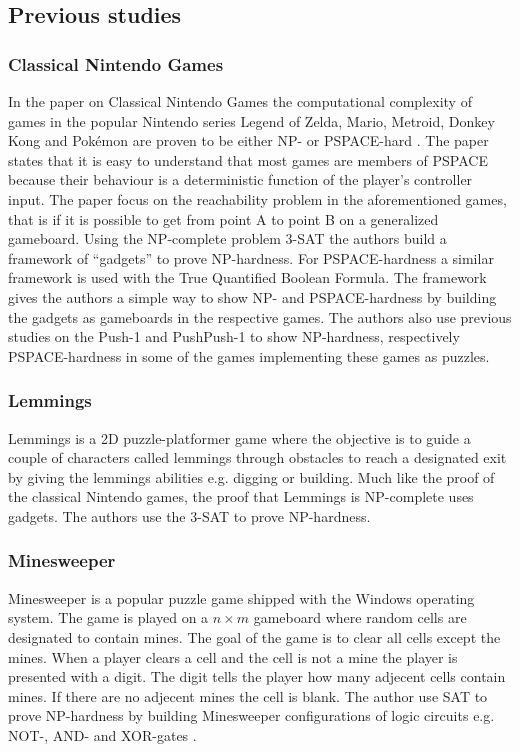 \subsection{Previous studies}
\subsubsection{Classical Nintendo Games}

In the paper on Classical Nintendo Games the computational complexity of games in the popular Nintendo series Legend of Zelda, Mario, Metroid, Donkey Kong and Pokémon are proven to be either NP- or PSPACE-hard \cite{classic}. The paper states that it is easy to understand that most games are members of PSPACE because their behaviour is a deterministic function of the player's controller input. The paper focus on the reachability problem in the aforementioned games, that is if it is possible to get from point A to point B on a generalized gameboard. Using the NP-complete problem 3-SAT the authors build a framework of ``gadgets'' to prove NP-hardness. For PSPACE-hardness a similar framework is used with the True Quantified Boolean Formula. The framework gives the authors a simple way to show NP- and PSPACE-hardness by building the gadgets as gameboards in the respective games. The authors also use previous studies on the Push-1 \cite{push1} and PushPush-1 \cite{pushpushk} to show NP-hardness, respectively PSPACE-hardness in some of the games implementing these games as puzzles. 

\subsubsection{Lemmings}

Lemmings is a 2D puzzle-platformer game where the objective is to guide a couple of characters called lemmings through obstacles to reach a designated exit by giving the lemmings abilities e.g. digging or building. Much like the proof of the classical Nintendo games, the proof that Lemmings is NP-complete uses gadgets. The authors use the 3-SAT to prove NP-hardness. 

\subsubsection{Minesweeper}
Minesweeper is a popular puzzle game shipped with the Windows operating system. The game is played on a $n \times m$ gameboard where random cells are designated to contain mines. The goal of the game is to clear all cells except the mines. When a player clears a cell and the cell is not a mine the player is presented with a digit. The digit tells the player how many adjecent cells contain mines. If there are no adjecent mines the cell is blank. The author use SAT to prove NP-hardness by building Minesweeper configurations of logic circuits e.g. NOT-, AND- and XOR-gates \cite{minesweeper}.

